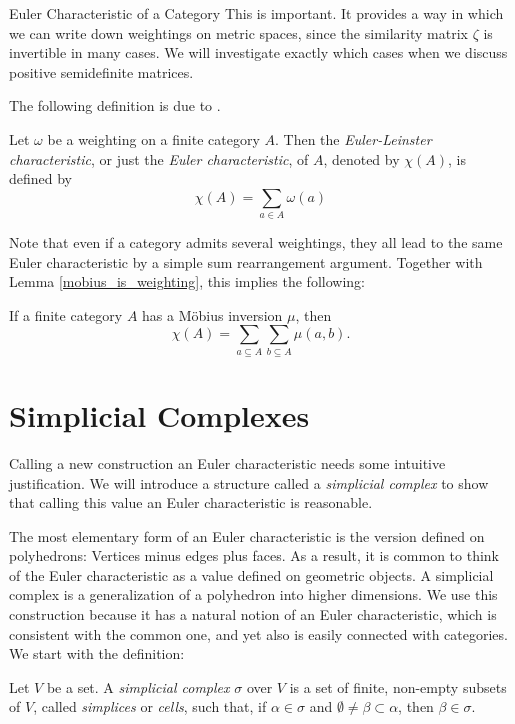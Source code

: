 \documentclass[12pt]{pom_thesis}
\begin{document}
\begin{chapter}{Euler Characteristic of a Category}
This is important. It provides a way in which we can write down weightings on metric spaces, since the similarity matrix $\zeta$ is invertible in many cases. We will investigate exactly which cases when we discuss positive semidefinite matrices.

The following definition is due to \cite{Lein1}.
\begin{defn}\label{cat_euler}
Let $\omega$ be a weighting on a finite category $A$. Then the \emph{Euler-Leinster characteristic}, or just the \emph{Euler characteristic}, of $A$, denoted by $\chi(A)$, is defined by
\[
\chi(A) = \sum_{a \in A} \omega(a)
\]
\end{defn}
Note that even if a category admits several weightings, they all lead to the same Euler characteristic by a simple sum rearrangement argument. Together with Lemma \ref{mobius_is_weighting}, this implies the following:
\begin{cor}\label{euler_mu}
If a finite category $A$ has a M\"obius inversion $\mu$, then
\[\chi(A) = \sum_{a \subseteq A} \sum_{b \subseteq A} \mu(a, b).
\]
\end{cor}
\section{Simplicial Complexes}
Calling a new construction an Euler characteristic needs some intuitive justification. We will introduce a structure called a \textit{simplicial complex} to show that calling this value an Euler characteristic is reasonable. 

The most elementary form of an Euler characteristic is the version defined on polyhedrons: Vertices minus edges plus faces. As a result, it is common to think of the Euler characteristic as a value defined on geometric objects. A simplicial complex is a generalization of a polyhedron into higher dimensions. We use this construction because it has a natural notion of an Euler characteristic, which is consistent with the common one, and yet also is easily connected with categories. We start with the definition:

\begin{defn}
Let $V$ be a set. A \emph{simplicial complex} $\sigma$ over $V$ is a set of finite, non-empty subsets of $V$, called \emph{simplices} or \emph{cells}, such that, if $\alpha \in \sigma$ and $\emptyset \neq \beta \subset \alpha$, then $\beta \in \sigma$.
\end{defn}


\end{chapter}
\end{document}
